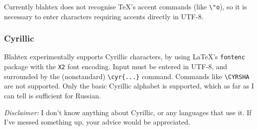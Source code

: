 \documentclass{article}
\newcommand{\texcommand}[1]{\textbackslash{}#1}
\begin{document}
{\begin{quote}
\end{quote}
}

\begin{latexonly}
\nonasciicharlist
\end{latexonly}

\begin{htmlonly}
\newcommand{\unichar}[1]{\rawhtml&\##1;\endrawhtml}
\nonasciicharlist
\end{htmlonly}

Currently blahtex does not recognise \TeX{}'s accent commands (like \texttt{\textbackslash"o}), so it is necessary to enter characters requiring accents directly in UTF-8.

\subsubsection{Cyrillic}

Blahtex experimentally supports Cyrillic characters, by using \LaTeX's \texttt{fontenc} package with the \texttt{X2} font encoding. Input must be entered in UTF-8, and surrounded by the (nonstandard) \texttt{\texcommand{cyr}\{...\}} command. Commands like \texttt{\texcommand{CYRSHA}} are not supported. Only the basic Cyrillic alphabet is supported, which as far as I can tell is sufficient for Russian.

\textit{Disclaimer:} I don't know anything about Cyrillic, or any languages that use it. If I've messed something up, your advice would be appreciated.
\end{document}
